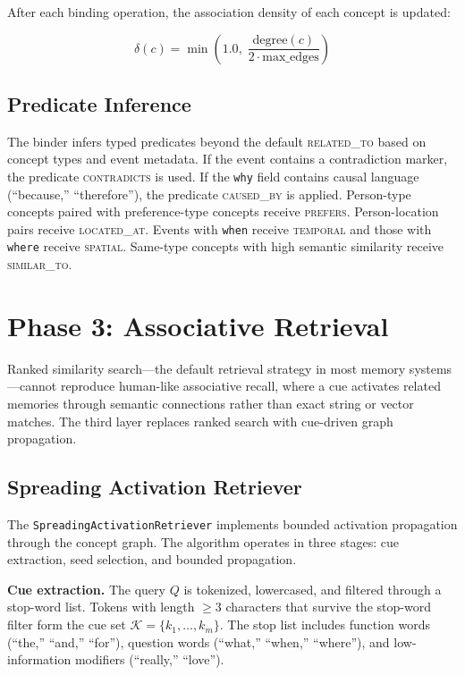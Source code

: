 \documentclass[11pt,twocolumn]{article}
\begin{document}
After each binding operation, the association density of each concept is updated:

\begin{equation}
\delta(c) = \min\left(1.0,\; \frac{\text{degree}(c)}{2 \cdot \text{max\_edges}}\right)
\label{eq:density}
\end{equation}

\subsection{Predicate Inference}

The binder infers typed predicates beyond the default \textsc{related\_to} based on concept types and event metadata. If the event contains a contradiction marker, the predicate \textsc{contradicts} is used. If the \texttt{why} field contains causal language (``because,'' ``therefore''), the predicate \textsc{caused\_by} is applied. Person-type concepts paired with preference-type concepts receive \textsc{prefers}. Person-location pairs receive \textsc{located\_at}. Events with \texttt{when} receive \textsc{temporal} and those with \texttt{where} receive \textsc{spatial}. Same-type concepts with high semantic similarity receive \textsc{similar\_to}.

\section{Phase 3: Associative Retrieval}

Ranked similarity search---the default retrieval strategy in most memory systems---cannot reproduce human-like associative recall, where a cue activates related memories through semantic connections rather than exact string or vector matches. The third layer replaces ranked search with cue-driven graph propagation.

\subsection{Spreading Activation Retriever}

The \texttt{SpreadingActivationRetriever} implements bounded activation propagation through the concept graph. The algorithm operates in three stages: cue extraction, seed selection, and bounded propagation.

\textbf{Cue extraction.} The query $Q$ is tokenized, lowercased, and filtered through a stop-word list. Tokens with length $\geq 3$ characters that survive the stop-word filter form the cue set $\mathcal{K} = \{k_1, \ldots, k_m\}$. The stop list includes function words (``the,'' ``and,'' ``for''), question words (``what,'' ``when,'' ``where''), and low-information modifiers (``really,'' ``love'').
\end{document}
